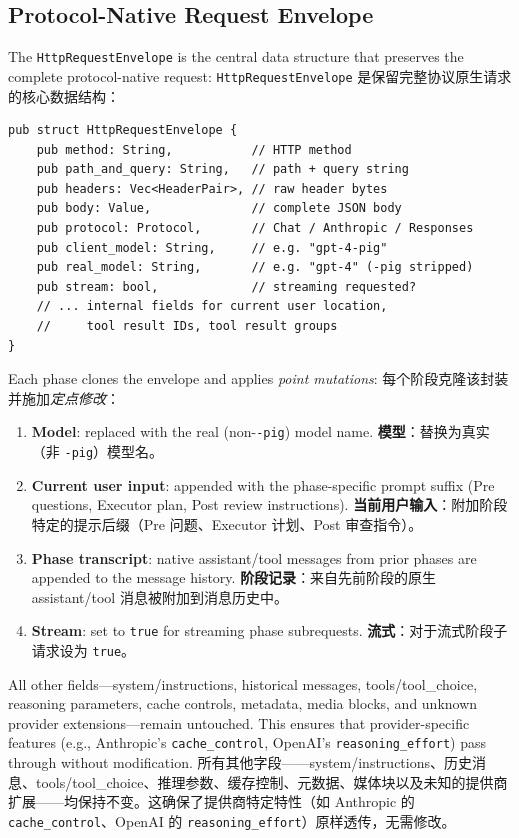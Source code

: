\subsection{Protocol-Native Request Envelope}
\label{sec:envelope}

The \texttt{HttpRequestEnvelope} is the central data structure that preserves the complete protocol-native request:
\texttt{HttpRequestEnvelope} 是保留完整协议原生请求的核心数据结构：

\begin{lstlisting}
pub struct HttpRequestEnvelope {
    pub method: String,           // HTTP method
    pub path_and_query: String,   // path + query string
    pub headers: Vec<HeaderPair>, // raw header bytes
    pub body: Value,              // complete JSON body
    pub protocol: Protocol,       // Chat / Anthropic / Responses
    pub client_model: String,     // e.g. "gpt-4-pig"
    pub real_model: String,       // e.g. "gpt-4" (-pig stripped)
    pub stream: bool,             // streaming requested?
    // ... internal fields for current user location,
    //     tool result IDs, tool result groups
}
\end{lstlisting}

Each phase clones the envelope and applies \emph{point mutations}:
每个阶段克隆该封装并施加\emph{定点修改}：

\begin{enumerate}[nosep]
    \item \textbf{Model}: replaced with the real (non-\texttt{-pig}) model name.
    \textbf{模型}：替换为真实（非 \texttt{-pig}）模型名。
    \item \textbf{Current user input}: appended with the phase-specific prompt suffix (Pre questions, Executor plan, Post review instructions).
    \textbf{当前用户输入}：附加阶段特定的提示后缀（Pre 问题、Executor 计划、Post 审查指令）。
    \item \textbf{Phase transcript}: native assistant/tool messages from prior phases are appended to the message history.
    \textbf{阶段记录}：来自先前阶段的原生 assistant/tool 消息被附加到消息历史中。
    \item \textbf{Stream}: set to \texttt{true} for streaming phase subrequests.
    \textbf{流式}：对于流式阶段子请求设为 \texttt{true}。
\end{enumerate}

All other fields---system/instructions, historical messages, tools/tool\_choice, reasoning parameters, cache controls, metadata, media blocks, and unknown provider extensions---remain untouched. This ensures that provider-specific features (e.g., Anthropic's \texttt{cache\_control}, OpenAI's \texttt{reasoning\_effort}) pass through without modification.
所有其他字段——system/instructions、历史消息、tools/tool\_choice、推理参数、缓存控制、元数据、媒体块以及未知的提供商扩展——均保持不变。这确保了提供商特定特性（如 Anthropic 的 \texttt{cache\_control}、OpenAI 的 \texttt{reasoning\_effort}）原样透传，无需修改。

